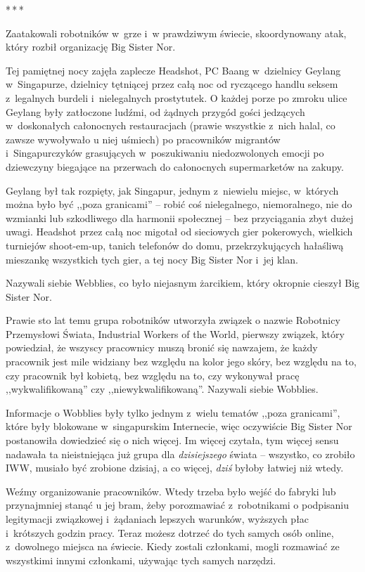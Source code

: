 \documentclass[oneside,polish,11pt,rmheadings]{mwbk}
\newcommand{\threeast}{\par\centerline{*\,*\,*}\medskip\par}
\begin{document}
\threeast

Zaatakowali robotników w~grze i~w prawdziwym świecie, skoordynowany atak, który rozbił organizację Big Sister Nor. 

Tej pamiętnej nocy zajęła zaplecze Headshot, PC Baang w~dzielnicy Geylang w~Singapurze, dzielnicy tętniącej przez całą noc od ryczącego handlu seksem z~legalnych burdeli i~nielegalnych prostytutek. O każdej porze po zmroku ulice Geylang były zatłoczone ludźmi, od żądnych przygód gości jedzących w~doskonałych całonocnych restauracjach (prawie wszystkie z~nich halal, co zawsze wywoływało u niej uśmiech) po pracowników migrantów i~Singapurczyków grasujących w~poszukiwaniu niedozwolonych emocji po dziewczyny biegające na przerwach do całonocnych supermarketów na zakupy. 


Geylang był tak rozpięty, jak Singapur, jednym z~niewielu miejsc, w~których można było być ,,poza granicami'' -- robić coś nielegalnego, niemoralnego, nie do wzmianki lub szkodliwego dla harmonii społecznej -- bez przyciągania zbyt dużej uwagi. Headshot przez całą noc migotał od sieciowych gier pokerowych, wielkich turniejów shoot-em-up, tanich telefonów do domu, przekrzykujących hałaśliwą mieszankę wszystkich tych gier, a tej nocy Big Sister Nor i~jej klan. 


Nazywali siebie Webblies, co było niejasnym żarcikiem, który okropnie cieszył Big Sister Nor. 

Prawie sto lat temu grupa robotników utworzyła związek o nazwie Robotnicy Przemysłowi Świata, Industrial Workers of the World, pierwszy związek, który powiedział, że wszyscy pracownicy muszą bronić się nawzajem, że każdy pracownik jest mile widziany bez względu na kolor jego skóry, bez względu na to, czy pracownik był kobietą, bez względu na to, czy wykonywał pracę ,,wykwalifikowaną'' czy ,,niewykwalifikowaną''. Nazywali siebie Wobblies. 


Informacje o Wobblies były tylko jednym z~wielu tematów ,,poza granicami'', które były blokowane w~singapurskim Internecie, więc oczywiście Big Sister Nor postanowiła dowiedzieć się o nich więcej. Im więcej czytała, tym więcej sensu nadawała ta nieistniejąca już grupa dla \textit{dzisiejszego} świata -- wszystko, co zrobiło IWW, musiało być zrobione dzisiaj, a co więcej, \textit{dziś }byłoby łatwiej niż wtedy. 


Weźmy organizowanie pracowników. Wtedy trzeba było wejść do fabryki lub przynajmniej stanąć u jej bram, żeby porozmawiać z~robotnikami o podpisaniu legitymacji związkowej i~żądaniach lepszych warunków, wyższych płac i~krótszych godzin pracy. Teraz możesz dotrzeć do tych samych osób online, z~dowolnego miejsca na świecie. Kiedy zostali członkami, mogli rozmawiać ze wszystkimi innymi członkami, używając tych samych narzędzi. 
\end{document}
